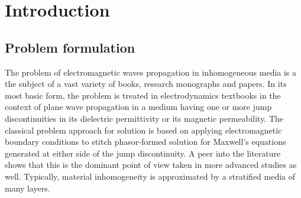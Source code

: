 \documentclass[twocolumn,secnumarabic,amssymb, nobibnotes, aps, prd]{revtex4-1}
\begin{document}
\section{Introduction}
\subsection{Problem formulation}
The problem of electromagnetic waves propagation in inhomogeneous media is a the subject of a vast variety of books, research monographs and papers. In its most basic form, the problem is treated in electrodynamics textbooks \cite{jackson1999classical, cheng2006fieldAndWave} in the context of plane wave propagation in a medium having one or more jump discontinuities in its dielectric permittivity or its magnetic permeability. The classical problem approach for solution is based on applying electromagnetic boundary conditions to stitch phasor-formed solution for Maxwell's equations generated at either side of the jump discontinuity. A peer into the literature shows that this is the dominant point of view taken in more advanced studies as well. Typically, material inhomogeneity is approximated by a stratified media of many layers. 
\\

 
\end{document}
